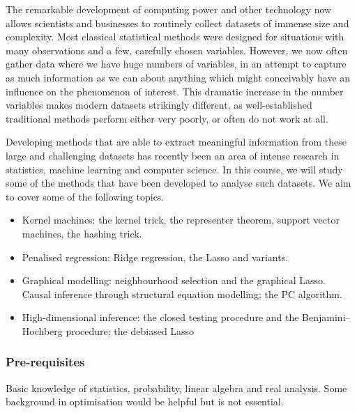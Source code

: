\documentclass[a4paper]{article}
\begin{document}
\maketitle
{\small
\setlength{\parindent}{0em}
\setlength{\parskip}{1em}

The remarkable development of computing power and other technology now allows scientists and businesses to routinely collect datasets of immense size and complexity. Most classical statistical methods were designed for situations with many observations and a few, carefully chosen variables. However, we now often gather data where we have huge numbers of variables, in an attempt to capture as much information as we can about anything which might conceivably have an influence on the phenomenon of interest. This dramatic increase in the number variables makes modern datasets strikingly different, as well-established traditional methods perform either very poorly, or often do not work at all.

Developing methods that are able to extract meaningful information from these large and challenging datasets has recently been an area of intense research in statistics, machine learning and computer science. In this course, we will study some of the methods that have been developed to analyse such datasets. We aim to cover some of the following topics.

\begin{itemize}
  \item Kernel machines: the kernel trick, the representer theorem, support vector machines, the hashing trick.
  \item Penalised regression: Ridge regression, the Lasso and variants.
  \item Graphical modelling: neighbourhood selection and the graphical Lasso. Causal inference through structural equation modelling; the PC algorithm.
  \item High-dimensional inference: the closed testing procedure and the Benjamini--Hochberg procedure; the debiased Lasso
\end{itemize}

\subsubsection*{Pre-requisites}
Basic knowledge of statistics, probability, linear algebra and real analysis. Some background in optimisation would be helpful but is not essential.
}
\tableofcontents

\setcounter{section}{-1}
\end{document}
